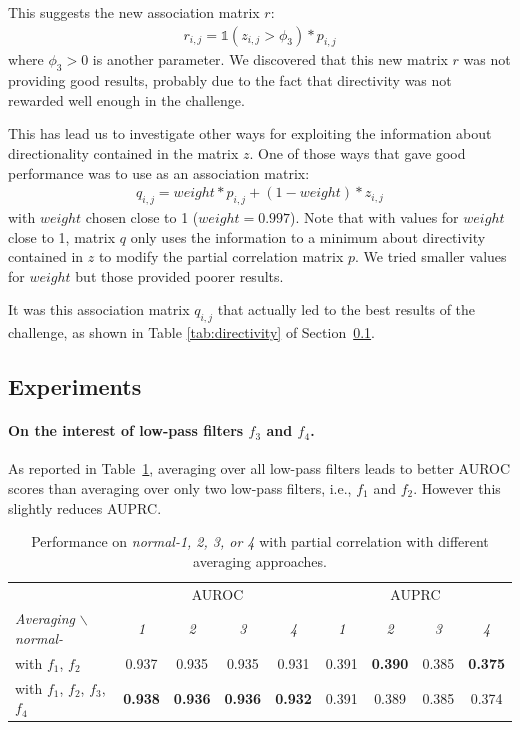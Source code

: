 \documentclass[wcp]{jmlr}
\begin{document}
This suggests the new association matrix $r$:
\begin{align}
r_{i,j} =  \mathbb{1}(z_{i,j} > \phi_3)  *  p_{i,j}
\end{align}
where $\phi_3 >0$ is another parameter. We discovered that this new
matrix $r$ was not providing good results, probably due to the fact that
directivity was not rewarded well enough in the challenge.

This has lead us to investigate other ways for exploiting the
information about directionality contained in the matrix $z$. One of
those ways that gave good performance was to use as an association
matrix:
\begin{align}
q_{i,j} = weight * p_{i,j} + (1-weight) * z_{i,j}
\label{eqn:qij}
\end{align}
with  $weight$ chosen close to 1 ($weight=0.997$). Note that with
values for $weight$ close to 1,   matrix $q$ only uses the
information to a minimum about directivity contained in $z$ to modify the  partial
correlation matrix $p$. We tried smaller values for $weight$ but those
provided poorer results.

It was  this association matrix $q_{i,j}$ that actually led to the
best results of the challenge, as shown in Table \ref{tab:directivity}
of Section~\ref{sapp:results}.


\subsection{Experiments}
\label{sapp:results}

\paragraph{On the interest of low-pass filters $f_3$ and $f_4$.}

As reported in Table~\ref{tab:f3f4}, averaging over all low-pass filters leads
to better AUROC scores than averaging over only two low-pass filters, i.e., $f_1$ and
$f_2$. However this slightly reduces AUPRC.

\begin{table}[ht]
\caption{Performance on \textit{normal-1, 2, 3, or 4} with partial correlation with different averaging approaches.}
\label{tab:f3f4}
\centering
\small
\begin{tabular}{| l | c c c c | c c c c |}
\hline
& \multicolumn{4}{c|}{AUROC} & \multicolumn{4}{c|}{AUPRC} \\
\textit{Averaging} $\backslash$ \textit{normal-} & \textit{1} & \textit{2} & \textit{3} & \textit{4} & \textit{1} & \textit{2} & \textit{3} & \textit{4} \\
\hline
\hline
 with $f_1$, $f_2$ & 0.937 & 0.935 & 0.935 & 0.931 & 0.391 &  \textbf{0.390} &  0.385 & \textbf{0.375}  \\
 with $f_1$, $f_2$, $f_3$, $f_4$ & \textbf{0.938} & \textbf{0.936} & \textbf{0.936} & \textbf{0.932} & 0.391 & 0.389 & 0.385 & 0.374\\
\hline
\end{tabular}
\end{table}
\end{document}
